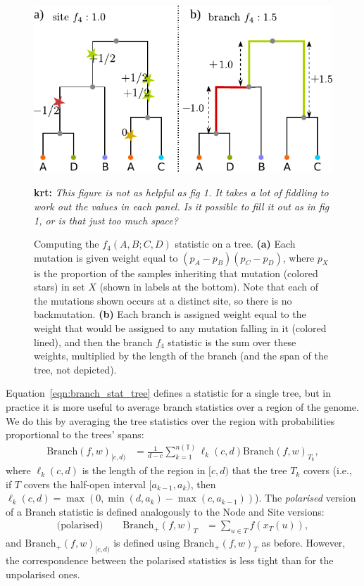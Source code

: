 \documentclass{article}
\newcommand{\branch}{\mbox{Branch}} %
\newcommand{\branchp}{\mbox{Branch}_+} %
\newcommand{\treeseq}{\mathbb{T}} %
\newcommand{\iw}{w} %
\newcommand{\nw}{x} %
\newcommand{\krt}[1]{{\color{green}\textbf{krt:} \it #1}}
\begin{document}
\begin{figure}
    \centering
    \includegraphics{figures/branch_site_diagram}
    \caption{
    Computing the $f_4(A,B;C,D)$ statistic on a tree.
    \textbf{(a)} Each mutation is given weight equal to $(p_A - p_B)(p_C - p_D)$,
    where $p_X$ is the proportion of the samples inheriting that mutation (colored stars) in set $X$
    (shown in labels at the bottom).
    Note that each of the mutations shown occurs at a distinct site, so there is no backmutation.
    \textbf{(b)} Each branch is assigned weight equal to the weight that would be assigned
    to any mutation falling in it (colored lined), and then the branch $f_4$ statistic
    is the sum over these weights, multiplied by the length of the branch
    (and the span of the tree, not depicted).
        \label{fig:branch_site_diagram}
    }
    \krt{This figure is not as helpful as fig 1. It takes a lot of fiddling to work out the values in each panel. Is it
    possible to fill it out as in fig 1, or is that just too much space?}
\end{figure}

Equation~\eqref{eqn:branch_stat_tree} defines a statistic for a single tree,
but in practice it is more useful to average branch statistics
over a region of the genome. We do this by averaging the tree statistics over the region
with probabilities proportional to the trees' spans:
\begin{align}
    \branch(f, \iw)_{[c,d)}
    &=
    \frac{1}{d-c} \sum_{k=1}^{n(\treeseq)} \ell_k(c,d) \branch(f, \iw)_{T_k} ,
\end{align}
where $\ell_k(c,d)$ is the length of the region in $[c,d)$ that the tree $T_k$ covers
(i.e., if $T$ covers the half-open interval $[a_{k-1},a_k)$,
then $\ell_k(c,d) = \max(0, \min(d,a_k) - \max(c,a_{k-1}))$).
The \emph{polarised} version of a Branch statistic
is defined analogously to the Node and Site versions:
\begin{align} \label{eqn:branch_polarised}
    \text{(polarised)} \qquad
    \branchp(f, \iw)_T
    &=
    \sum_{u \in T} f(\nw_{T}(u)) ,
\end{align}
and $\branchp(f, \iw)_{[c,d)}$ is defined using $\branchp(f, \iw)_T$ as before.
However, the correspondence between the polarised statistics is less tight
than for the unpolarised ones.
\end{document}
